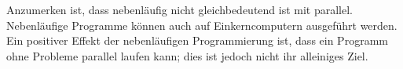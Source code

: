 Anzumerken ist, dass nebenläufig nicht gleichbedeutend ist mit parallel.
Nebenläufige Programme können auch auf Einkerncomputern ausgeführt werden.
Ein positiver Effekt der nebenläufigen Programmierung ist, dass ein 
Programm ohne Probleme parallel laufen kann; dies ist jedoch nicht ihr 
alleiniges Ziel.

